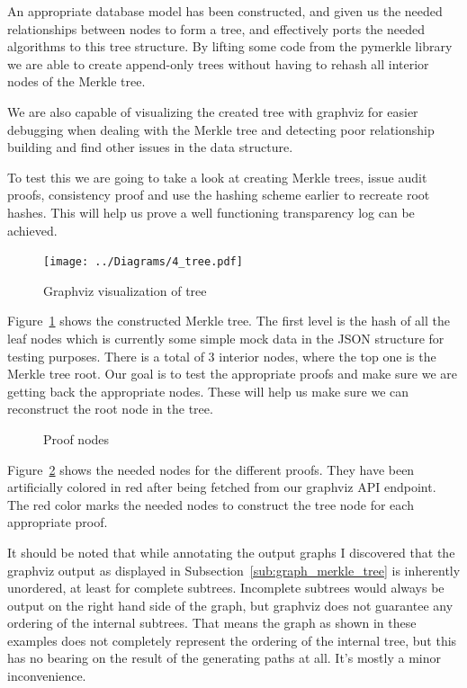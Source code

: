 \documentclass[../Main/thesis.tex]{subfiles}
\begin{document}
An appropriate database model has been constructed, and given us the needed
relationships between nodes to form a tree, and effectively ports the needed
algorithms to this tree structure. By lifting some code from the pymerkle
library we are able to create append-only trees without having to rehash all
interior nodes of the Merkle tree.

We are also capable of visualizing the created tree with graphviz for easier
debugging when dealing with the Merkle tree and detecting poor relationship
building and find other issues in the data structure.

To test this we are going to take a look at creating Merkle trees, issue audit
proofs, consistency proof and use the hashing scheme earlier to recreate root
hashes. This will help us prove a well functioning transparency log can be
achieved.

\begin{figure}[H]
\centering
\texttt{[image: ../Diagrams/4\_tree.pdf]}
\caption{Graphviz visualization of tree}
\label{fig:graph}
\end{figure}


Figure~\ref{fig:graph} shows the constructed Merkle tree. The first level is the
hash of all the leaf nodes which is currently some simple mock data in the JSON
structure for testing purposes. There is a total of 3 interior nodes, where the
top one is the Merkle tree root. Our goal is to test the appropriate proofs and
make sure we are getting back the appropriate nodes. These will help us make
sure we can reconstruct the root node in the tree.

\begin{figure}[H]
\centering
{}
\qquad
{}
\caption{Proof nodes}
\label{fig:test_proof}
\end{figure}

Figure~\ref{fig:test_proof} shows the needed nodes for the different proofs.
They have been artificially colored in red after being fetched from our graphviz
API endpoint. The red color marks the needed nodes to construct the tree node
for each appropriate proof. 

It should be noted that while annotating the output graphs I discovered that the graphviz
output as displayed in Subsection~\ref{sub:graph_merkle_tree} is inherently
unordered, at least for complete subtrees. Incomplete subtrees would always be
output on the right hand side of the graph, but graphviz does not guarantee
any ordering of the internal subtrees. That means the graph as shown in these
examples does not completely represent the ordering of the internal tree, but
this has no bearing on the result of the generating paths at all. It's mostly a
minor inconvenience.
\end{document}
